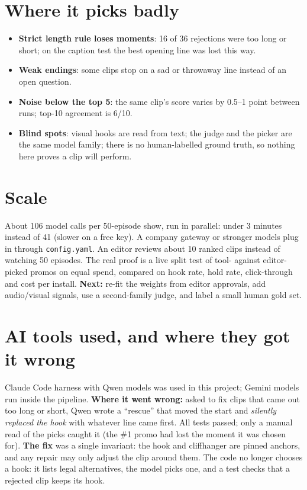 \documentclass[10pt]{article}
\begin{document}
\section{Where it picks badly}
\begin{itemize}
\item \textbf{Strict length rule loses moments}: 16 of 36 rejections were too long or short; on the caption test the best
opening line was lost this way.
\item \textbf{Weak endings}: some clips stop on a sad or throwaway line instead of an open question.
\item \textbf{Noise below the top 5}: the same clip's score varies by 0.5--1 point between runs; top-10 agreement is 6/10.
\item \textbf{Blind spots}: visual hooks are read from text; the judge and the picker are the same model family; there is
no human-labelled ground truth, so nothing here proves a clip will perform.
\end{itemize}

\section{Scale}
About 106 model calls per 50-episode show, run in parallel: under 3 minutes instead of 41 (slower on a free key).
A company gateway or stronger models plug in through \texttt{config.yaml}. An editor reviews about 10 ranked clips
instead of watching 50 episodes. The real proof is a live split test of tool- against editor-picked promos on equal
spend, compared on hook rate, hold rate, click-through and cost per install. \textbf{Next:} re-fit the weights from
editor approvals, add audio/visual signals, use a second-family judge, and label a small human gold set.

\section{AI tools used, and where they got it wrong}
Claude Code harness with Qwen models was used in this project; Gemini models run inside the pipeline.
\textbf{Where it went wrong:} asked to fix clips that came out too long or short, Qwen wrote a ``rescue'' that moved
the start and \emph{silently replaced the hook} with whatever line came first. All tests passed; only a manual read of
the picks caught it (the \#1 promo had lost the moment it was chosen for). \textbf{The fix} was a single invariant:
the hook and cliffhanger are pinned anchors, and any repair may only adjust the clip around them. The code
no longer chooses a hook: it lists legal alternatives, the model picks one, and a test checks that a
rejected clip keeps its hook.
\end{document}
